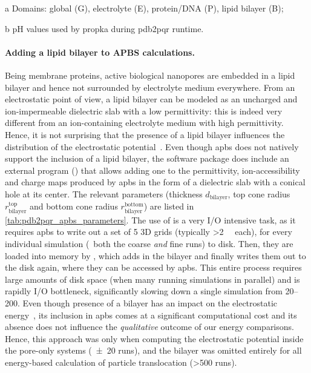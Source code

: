 \begin{landscape}
\begin{threeparttable}[p]
  \begin{tablenotes}
   \item[a] Domains: global (G), electrolyte (E), protein/DNA (P), lipid bilayer (B);
   \item[b] pH values used by \gls{propka} during \gls{pdb2pqr} runtime.
  \end{tablenotes}

\end{threeparttable}
\end{landscape}
%

\paragraph{Adding a lipid bilayer to APBS calculations.}
%
Being membrane proteins, active biological nanopores are embedded in a lipid bilayer and hence not surrounded
by electrolyte medium everywhere. From an electrostatic point of view, a lipid bilayer can be modeled as an
uncharged and ion-impermeable dielectric slab with a low permittivity: this is indeed very different from an
ion-containing electrolyte medium with high permittivity. Hence, it is not surprising that the presence of a
lipid bilayer influences the distribution of the electrostatic potential~\cite{Homeyer-2015}. Even though
\Gls{apbs} does not natively support the inclusion of a lipid bilayer, the software package does include an
external program () that allows adding one to the permittivity, ion-accessibility and
charge maps produced by \gls{apbs} in the form of a dielectric slab with a conical hole at its center. The
relevant parameters (thickness $d_{\textrm{bilayer}}$, top cone radius $r_{\textrm{bilayer}}^{\textrm{top}}$
and bottom cone radius $r_{\textrm{bilayer}}^{\textrm{bottom}}$) are listed in
\cref{tab:pdb2pqr_apbs_parameters}. The use of  is a very I/O intensive task, as it
requires \gls{apbs} to write out a set of 5 3D grids (typically \SI{>2}{\gibi\byte} each), for every
individual simulation (\ie~both the coarse \emph{and} fine runs) to disk. Then, they are loaded into memory by
, which adds in the bilayer and finally writes them out to the disk again, where they
can be accessed by \gls{apbs}. This entire process requires large amounts of disk space (when many running
simulations in parallel) and is rapidly I/O bottleneck, significantly slowing down a single simulation from
\SIrange{20}{200}{\min}. Even though presence of a bilayer has an impact on the electrostatic
energy~\cite{Bonthuis-2006}, its inclusion in \gls{apbs} comes at a significant computational cost and its
absence does not influence the \emph{qualitative} outcome of our energy comparisons. Hence, this approach was
only when computing the electrostatic potential inside the pore-only systems (\num{\pm20} runs), and the
bilayer was omitted entirely for all energy-based calculation of particle translocation (\num{>500} runs).  


